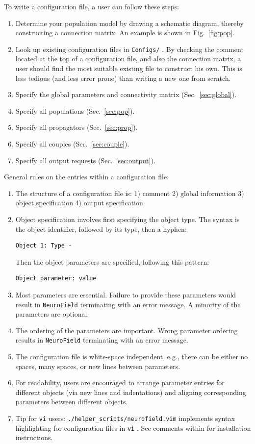 \documentclass[12pt,a4paper]{article}
\newcommand{\type}[1]{ {\small\small\tt #1} }
\newcommand{\NF}[0]{ \type{NeuroField}}
\begin{document}
To write a configuration file, a user can follow these steps:
\begin{enumerate}
\item Determine your population model by drawing a schematic diagram, thereby constructing a connection matrix. An example is shown in Fig.~\ref{fig:pop}.
\item Look up existing configuration files in \type{Configs/}. By checking the comment located at the top of a configuration file, and also the connection matrix, a user should find the most suitable existing file to construct his own. This is less tedious (and less error prone) than writing a new one from scratch.
\item Specify the global parameters and connectivity matrix (Sec.~\ref{sec:global}).
\item Specify all populations (Sec.~\ref{sec:pop}).
\item Specify all propagators (Sec.~\ref{sec:prop}).
\item Specify all couples (Sec.~\ref{sec:couple}).
\item Specify all output requests (Sec.~\ref{sec:output}).
\end{enumerate}

General rules on the entries within a configuration file:

\begin{enumerate}
	\item The structure of a configuration file is: 1) comment 2) global information 3) object specification 4) output specification.
	\item Object specification involves first specifying the object type. The syntax is the object identifier, followed by its type, then a hyphen:
		\begin{lstlisting}
Object 1: Type -
		\end{lstlisting}
		Then the object parameters are specified, following this pattern:
		\begin{lstlisting}
Object parameter: value
		\end{lstlisting}
	\item Most parameters are essential. Failure to provide these parameters would result in \NF terminating with an error message. A minority of the parameters are optional.
	\item The ordering of the parameters are important. Wrong parameter ordering results in \NF terminating with an error message.
	\item The configuration file is white-space independent, e.g., there can be either no spaces, many spaces, or new lines between parameters.
	\item For readability, users are encouraged to arrange parameter entries for different objects (via new lines and indentations) and aligning corresponding parameters between different objects.
	\item Tip for \type{vi} users: \type{./helper\_scripts/neurofield.vim} implements syntax highlighting for configuration files in \type{vi}. See comments within for installation instructions.
\end{enumerate}
\end{document}
